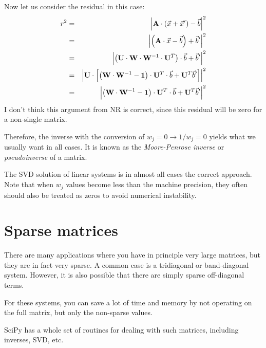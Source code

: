 Now let us consider the residual in this case:
\begin{eqnarray}
r^2 &=& \left|{\bf A}\cdot\left(\vec{x}
+ \vec{x}'\right)- \vec{b}\right|^2 \cr
 &=& \left|\left({\bf A}\cdot\vec{x} - \vec{b}\right)
+ \vec{b}'\right|^2 \cr
 &=& \left|\left({\bf U}\cdot{\bf W}\cdot{\bf W}^{-1}\cdot{\bf U}^T\right)\cdot\vec{b}
+ \vec{b}'\right|^2 \cr
 &=& \left|{\bf U}\cdot\left[\left({\bf W}\cdot{\bf W}^{-1}
 - {\bf 1}\right)\cdot{\bf U}^T\cdot\vec{b}
+ {\bf U}^T\vec{b}'\right]\right|^2 \cr
 &=& \left|\left({\bf W}\cdot{\bf W}^{-1}
 - {\bf 1}\right)\cdot{\bf U}^T\cdot\vec{b}
+ {\bf U}^T\vec{b}'\right|^2
\end{eqnarray}
I don't think this argument from NR is correct, since this residual
will be zero for a non-single matrix.


Therefore, the inverse with the conversion of $w_j = 0\rightarrow
1/w_j = 0$ yields what we usually want in all cases. It is known as
the {\it Moore-Penrose inverse} or {\it pseudoinverse} of a matrix. 

The SVD solution of linear systems is in almost all cases the correct
approach. Note that when $w_j$ values become less than the machine
precision, they often should also be treated as zeros to avoid
numerical instability.

\section{Sparse matrices}

There are many applications where you have in principle very large
matrices, but they are in fact very sparse. A common case is a
tridiagonal or band-diagonal system. However, it is also possible that
there are simply sparse off-diagonal terms. 

For these systems, you can save a lot of time and memory by not
operating on the full matrix, but only the non-sparse values.

SciPy has a whole set of routines for dealing with such matrices,
including inverses, SVD, etc. 

